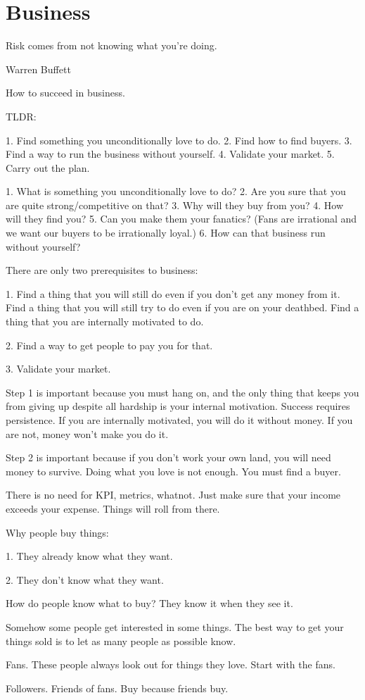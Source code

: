 \chapter{Business}

\epigraph{Risk comes from not knowing what you're doing.}{Warren Buffett}

How to succeed in business.

TLDR:

1. Find something you unconditionally love to do.
2. Find how to find buyers.
3. Find a way to run the business without yourself.
4. Validate your market.
5. Carry out the plan.

1. What is something you unconditionally love to do?
2. Are you sure that you are quite strong/competitive on that?
3. Why will they buy from you?
4. How will they find you?
5. Can you make them your fanatics? (Fans are irrational and we want our buyers to be irrationally loyal.)
6. How can that business run without yourself?

There are only two prerequisites to business:

1. Find a thing that you will still do even if you don't get any money from it.
Find a thing that you will still try to do even if you are on your deathbed.
Find a thing that you are internally motivated to do.

2. Find a way to get people to pay you for that.

3. Validate your market.

Step 1 is important because you must hang on, and the only thing
that keeps you from giving up despite all hardship is your internal motivation.
Success requires persistence.
If you are internally motivated, you will do it without money.
If you are not, money won't make you do it.

Step 2 is important because if you don't work your own land,
you will need money to survive.
Doing what you love is not enough. You must find a buyer.

There is no need for KPI, metrics, whatnot.
Just make sure that your income exceeds your expense.
Things will roll from there.

Why people buy things:

1. They already know what they want.

2. They don't know what they want.

How do people know what to buy?
They know it when they see it.

Somehow some people get interested in some things.
The best way to get your things sold is to let as many people as possible know.

Fans. These people always look out for things they love.
Start with the fans.

Followers. Friends of fans. Buy because friends buy.
